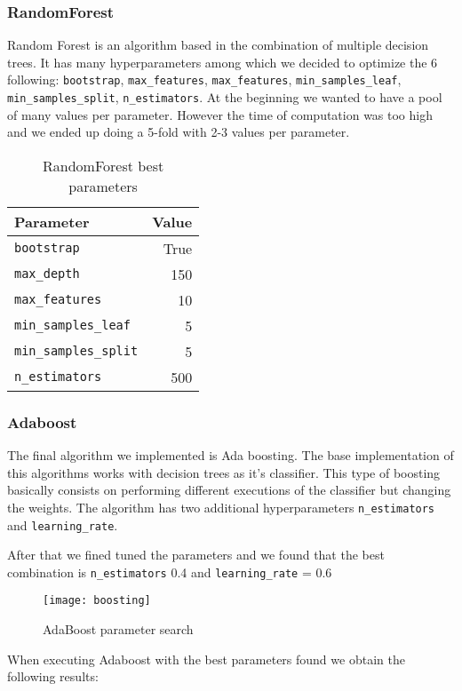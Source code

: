 \begin{verbatim}
\end{verbatim}
 
\pagebreak
\subsubsection{RandomForest}

Random Forest is an algorithm based in the combination of multiple decision trees. It has many hyperparameters among which we decided to optimize the 6 following: \texttt{bootstrap}, \texttt{max\_features}, \texttt{max\_features}, \texttt{min\_samples\_leaf}, \texttt{min\_samples\_split}, \texttt{n\_estimators}. At the beginning we wanted to have a pool of 
many values per parameter. However the time of computation was too high and we ended up doing a 5-fold with 2-3 values per parameter. 

\begin{table}[H]
\centering
\caption{RandomForest best parameters}
\begin{tabular}{lr}
\toprule
Parameter & Value \\
\midrule
\texttt{bootstrap} & True \\
\texttt{max\_depth} & 150 \\
\texttt{max\_features} & 10 \\
\texttt{min\_samples\_leaf} & 5 \\
\texttt{min\_samples\_split} & 5 \\
\texttt{n\_estimators} & 500 \\
\bottomrule
\end{tabular}
\end{table}


\subsubsection{Adaboost}

The final algorithm we implemented is Ada boosting. The base implementation of this algorithms works with decision trees as it's classifier. This type of boosting basically consists on performing different executions of the classifier but changing the weights. The algorithm has two additional hyperparameters \texttt{n\_estimators} and \texttt{learning\_rate}.

After that we fined tuned the parameters and we found that the best combination is \texttt{n\_estimators} 0.4 and \texttt{learning\_rate} = 0.6

\begin{figure}[H]
\centering
\texttt{[image: boosting]}
\caption{AdaBoost parameter search}%
\label{fig:boosting}
\end{figure}

When executing Adaboost with the best parameters found we obtain the following results:



